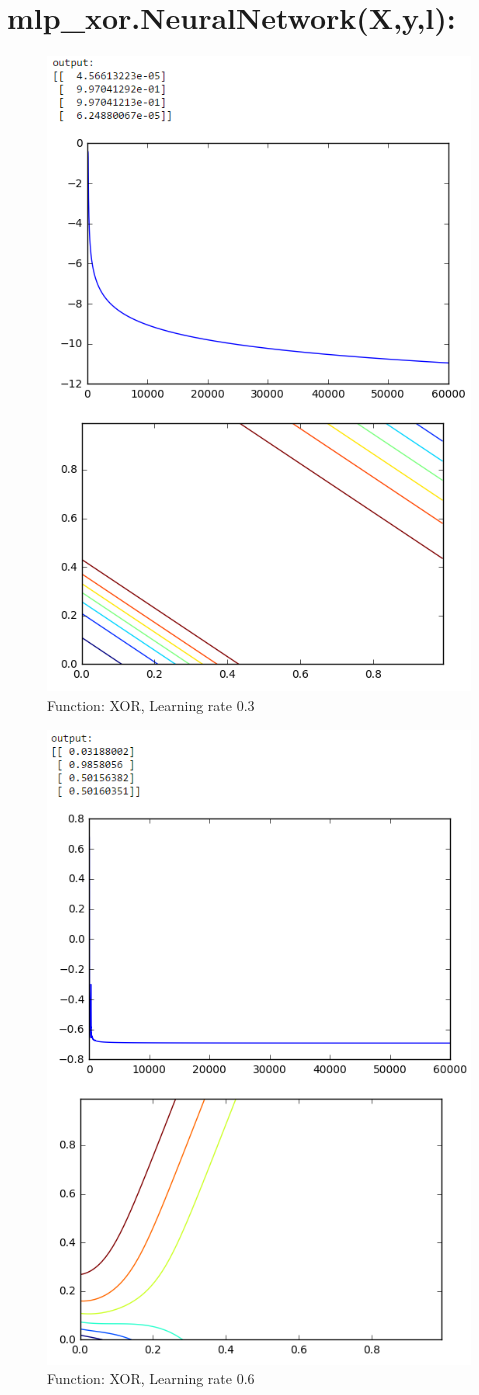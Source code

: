 \documentclass[11pt]{article}
\begin{document}
\section*{mlp\_xor.NeuralNetwork(X,y,l):}
\begin{figure}[H]
	\centering
	\includegraphics[width=0.7\linewidth]{xor_lr03}
	\caption{Function: XOR, Learning rate 0.3}
	\label{fig:xorlr03}
\end{figure}
\begin{figure}[H]
	\centering
	\includegraphics[width=0.7\linewidth]{xor_lr06}
	\caption{Function: XOR, Learning rate 0.6}
	\label{fig:xorlr06}
\end{figure}
\end{document}
